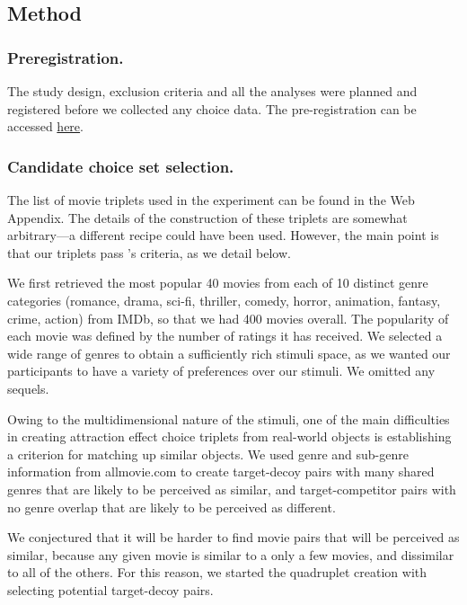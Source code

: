 \documentclass[12pt, a4paper]{article}
\begin{document}
\subsection*{Method}

\subsubsection*{Preregistration.}
The study design, exclusion criteria and all the analyses were planned and registered before we collected any choice data. The pre-registration can be accessed \href{https://osf.io/fme6c/?view_only=31da4193689f4247a76af93b2f98fcef}{here}.

\subsubsection*{Candidate choice set selection.}

The list of movie triplets used in the experiment can be found in the Web Appendix. The details of the construction of these triplets are somewhat arbitrary---a different recipe could have been used. However, the main point is that our triplets pass \citeauthor{Huber2014}'s \citeyear{Huber2014} criteria, as we detail below.

We first retrieved the most popular 40 movies from each of 10 distinct genre categories (romance, drama, sci-fi, thriller, comedy, horror, animation, fantasy, crime, action) from IMDb, so that we had 400 movies overall. The popularity of each movie was defined by the number of ratings it has received. We selected a wide range of genres to obtain a sufficiently rich stimuli space, as we wanted our participants to have a variety of preferences over our stimuli. We omitted any sequels.

Owing to the multidimensional nature of the stimuli, one of the main difficulties in creating attraction effect choice triplets from real-world objects is establishing a criterion for matching up similar objects. We used genre and sub-genre information from allmovie.com to create target-decoy pairs with many shared genres that are likely to be perceived as similar, and target-competitor pairs with no genre overlap that are likely to be perceived as different.

We conjectured that it will be harder to find movie pairs that will be perceived as similar, because any given movie is similar to a only a few movies, and dissimilar to all of the others. For this reason, we started the quadruplet creation with selecting potential target-decoy pairs.
\end{document}
